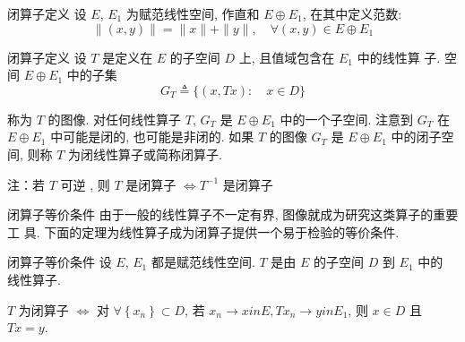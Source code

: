 \documentclass[sans,mathserif]{beamer} %
\begin{document}
\begin{frame}{闭算子定义}
	设 $ E$, $E_{1}$  为赋范线性空间, 作直和 $ E \oplus E_{1} $, 在其中定义范数:
\begin{equation}
	\|(x, y)\|=\|x\|+\|y\|, \quad \forall(x, y) \in E \oplus E_{1}
\end{equation}

\begin{definition}{闭算子定义}
	设 $ T $ 是定义在 $ E $ 的子空间 $ D $ 上, 且值域包含在 $ E_{1}$  中的线性算
子. 空间 $ E \oplus E_{1} $ 中的子集
\begin{equation*}
	G_{T} \triangleq\{(x, T x): \quad x \in D\}
\end{equation*}

称为 $T$ 的图像.
对任何线性算子 $ T$, $G_{T} $ 是  $E \oplus E_{1}$  中的一个子空间.
注意到  $G_{T}$  在 $ E \oplus E_{1} $ 中可能是闭的, 也可能是非闭的. 如果 $ T $ 的图像 $ G_{T}$
是 $ E \oplus E_{1}$  中的闭子空间, 则称 $ T $ 为闭线性算子或简称闭算子.

注：若 $T$ 可逆 , 则 $T$ 是闭算子 $\Leftrightarrow T^{−1}$ 是闭算子
\end{definition}
\end{frame}

\begin{frame}{闭算子等价条件}
	由于一般的线性算子不一定有界, 图像就成为研究这类算子的重要工
具. 下面的定理为线性算子成为闭算子提供一个易于检验的等价条件.

\begin{theorem}{闭算子等价条件}
	设 $ E$, $E_{1}$  都是赋范线性空间. $ T $ 是由 $ E $ 的子空间 $ D $ 到 $ E_{1} $ 中的
线性算子.

$ T $ 为闭算子  $\Longleftrightarrow$  对  $\forall\left\{x_{n}\right\} \subset D$,  若 $ x_{n} \rightarrow x  in  E, T x_{n} \rightarrow y  in  E_{1}$,
则  $x \in D$  且  $T x=y$.
\end{theorem}

\end{frame}
\end{document}
